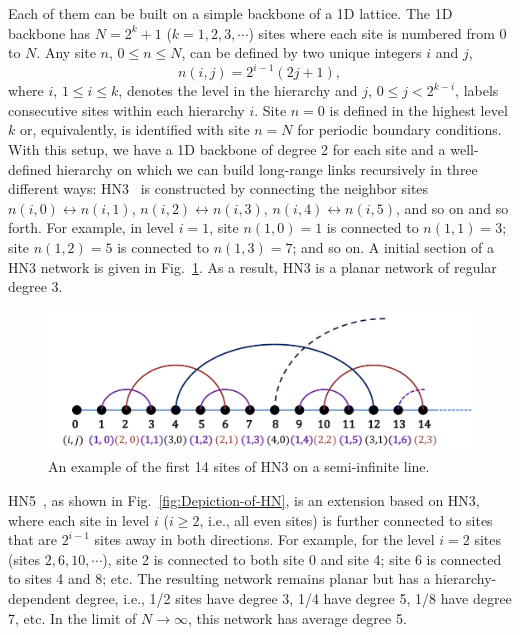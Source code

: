 Each of them can be built on
a simple backbone of a 1D lattice. The 1D backbone has $N=2^{k}+1$
($k=1,2,3,\cdots$) sites where each site is numbered from $0$ to
$N$. Any site $n$, $0\le n\le N$, can be defined by two unique
integers $i$ and $j$, 
\begin{equation}
n(i,j)=2^{i-1}(2j+1),\label{eq:numbering}
\end{equation}
where $i$, $1\le i\le k$, denotes the level in the hierarchy and
$j$, $0\le j<2^{k-i}$, labels consecutive sites within each
hierarchy $i$. Site $n=0$ is defined in the highest level $k$ or,
equivalently, is identified with site $n=N$ for periodic boundary
conditions. With this setup, we have a 1D backbone of degree
2 for each site and a well-defined hierarchy on which we can build
long-range links recursively in three different ways: HN3~\cite{Boettcher2008HN}
is constructed by connecting the neighbor sites $n(i,0)\longleftrightarrow n(i,1)$,
$n(i,2)\longleftrightarrow n(i,3)$, $n(i,4)\longleftrightarrow n(i,5)$,
and so on and so forth. For example, in level $i=1$, site $n(1,0)=1$
is connected to $n(1,1)=3$; site $n(1,2)=5$ is connected to $n(1,3)=7$;
and so on. A initial section of a HN3 network is given in Fig.~\ref{fig:HN3_short}.
As a result, HN3 is a planar network of regular degree 3.

\begin{figure}
\centering \includegraphics[width=1\columnwidth]{Chapter-1/HN3_short.pdf} 
\protect\caption{\label{fig:HN3_short} An example of the first 14 sites of HN3 on a semi-infinite line.}
\end{figure}




HN5~\cite{Boettcher09c}, as shown in Fig.~\ref{fig:Depiction-of-HN},
is an extension based on HN3, where each site in level $i$ ($i\ge2$,
i.e., all even sites) is further connected to sites that are $2^{i-1}$
sites away in both directions. For example, for the level $i=2$ sites
(sites $2,6,10,\cdots$), site 2 is connected to both site 0 and site
4; site 6 is connected to sites 4 and 8; etc. The resulting network
remains planar but has a hierarchy-dependent degree, i.e., 1/2 sites
have degree 3, 1/4 have degree 5, 1/8 have degree 7, etc. In the limit
of $N\to\infty$, this network has  average degree 5.

